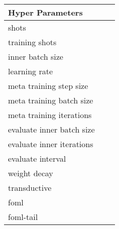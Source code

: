 \begin{tabular}{|l|l|l|}
\hline
Hyper Parameters          &  &  \\ \hline
shots                     &  &  \\ \hline
training shots            &  &  \\ \hline
inner batch size          &  &  \\ \hline
learning rate             &  &  \\ \hline
meta training step size   &  &  \\ \hline
meta training batch size  &  &  \\ \hline
meta training iterations  &  &  \\ \hline
evaluate inner batch size &  &  \\ \hline
evaluate inner iterations &  &  \\ \hline
evaluate interval         &  &  \\ \hline
weight decay              &  &  \\ \hline
transductive              &  &  \\ \hline
foml                      &  &  \\ \hline
foml-tail                 &  &  \\ \hline
\end{tabular}